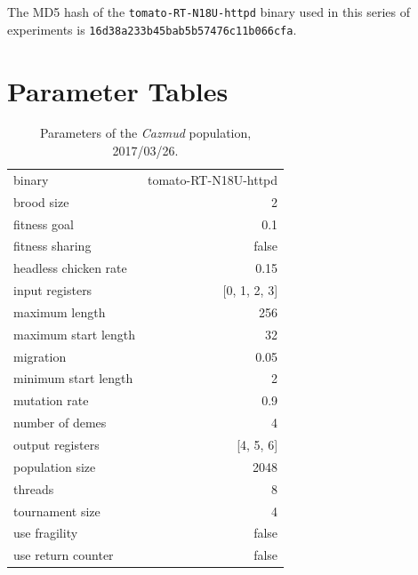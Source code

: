 \documentclass[12pt,glossary]{dalthesis}
\begin{document}
The MD5 hash of the \texttt{tomato-RT-N18U-httpd} binary used in this series of
experiments is \texttt{16d38a233b45bab5b57476c11b066cfa}.

\section{Parameter Tables}
\label{sec:org7efb5bb}
\begin{table}[htbp]
\caption{Parameters of the \emph{Cazmud} population, 2017/03/26.}
\centering
\begin{tabular}{lr}
binary & tomato-RT-N18U-httpd\\
brood size & 2\\
fitness goal & 0.1\\
fitness sharing & false\\
headless chicken rate & 0.15\\
input registers & [0, 1, 2, 3]\\
maximum length & 256\\
maximum start length & 32\\
migration & 0.05\\
minimum start length & 2\\
mutation rate & 0.9\\
number of demes & 4\\
output registers & [4, 5, 6]\\
population size & 2048\\
threads & 8\\
tournament size & 4\\
use fragility & false\\
use return counter & false\\
\end{tabular}
\end{table}
\end{document}

